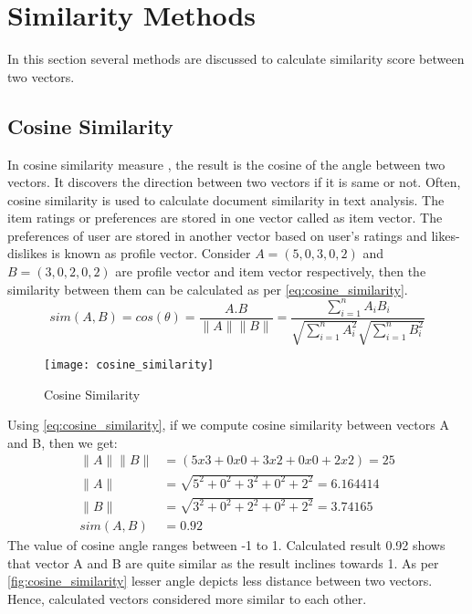 
\section{Similarity Methods}
\label{similarity_methods}
In this section several methods are discussed to calculate similarity score between two vectors.
\subsection{Cosine Similarity}
\label{cosine_similarity}

In cosine similarity measure \cite{19}, the result is the cosine of the angle between two vectors. It  discovers the direction between two vectors if it is same or not. Often, cosine similarity is used to calculate document similarity in text analysis. The item ratings or preferences are stored in one vector called as item vector. The preferences of user are stored in another vector based on user's ratings and likes-dislikes is known as profile vector. Consider $A = (5,0,3,0,2)$ and $B = (3,0,2,0,2)$ are profile vector and item vector respectively, then the similarity between them can be calculated as per \autoref{eq:cosine_similarity}.
\begin{equation}
sim(A,B) = cos(\theta) = \frac {A.B}{\parallel A \parallel \parallel B \parallel} = \frac{\sum_{i=1}^{n} {A_{i} B_{i}}}{\sqrt{\sum_{i=1}^{n} {A_{i}^2}} \sqrt{\sum_{i=1}^{n} {B_{i}^2}}}
\label{eq:cosine_similarity}
\end{equation}
\begin{figure}[H]
	\centering
	\texttt{[image: cosine\_similarity]}
	\caption{Cosine Similarity}
	\label{fig:cosine_similarity}
\end{figure}
\noindent
Using \autoref{eq:cosine_similarity}, if we compute cosine similarity between vectors A and B, then we get:
\begin{align*}
\parallel A \parallel \parallel B \parallel &=(5 x 3 + 0 x 0 + 3 x 2 + 0 x 0 + 2 x 2  ) = 25 \\
\parallel A \parallel  &= \sqrt{5^2 + 0^2 + 3^2 + 0^2 + 2^2}  = 6.164414 \\	     
\parallel B \parallel  &= \sqrt{3^2 + 0^2 + 2^2 + 0^2 + 2^2}  = 3.74165\\	     
sim(A,B)  &=  0.92 
\end{align*}
\noindent The value of cosine angle ranges between -1 to 1. Calculated result 0.92 shows that vector A and B are quite similar as the result inclines towards 1. As per \autoref{fig:cosine_similarity} lesser angle depicts less distance between two vectors. Hence, calculated vectors considered more similar to each other.

